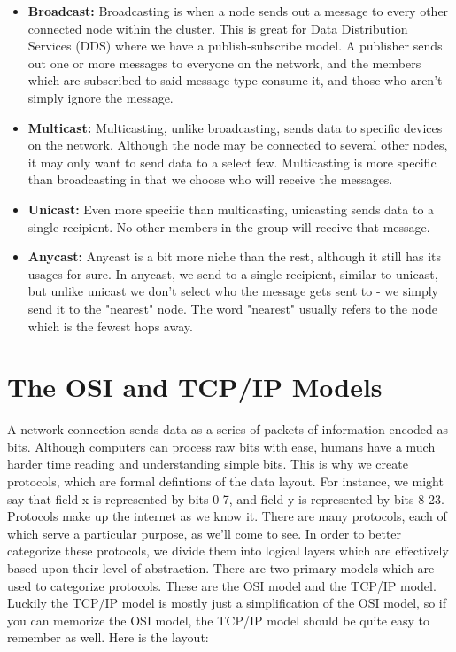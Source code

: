 \documentclass{article}
\begin{document}
\begin{itemize}

\item{%
    \textbf{Broadcast:} Broadcasting is when a node sends out a message to every other connected node within
    the cluster. This is great for Data Distribution Services (DDS) where we have a publish-subscribe model.
    A publisher sends out one or more messages to everyone on the network, and the members which are subscribed
    to said message type consume it, and those who aren't simply ignore the message.
}

\item{%
    \textbf{Multicast:} Multicasting, unlike broadcasting, sends data to specific devices on the network.
    Although the node may be connected to several other nodes, it may only want to send data to a select few.
    Multicasting is more specific than broadcasting in that we choose who will receive the messages.
}

\item{%
    \textbf{Unicast:} Even more specific than multicasting, unicasting sends data to a single recipient. No
    other members in the group will receive that message.
}

\item{%
    \textbf{Anycast:} Anycast is a bit more niche than the rest, although it still has its usages for sure.
    In anycast, we send to a single recipient, similar to unicast, but unlike unicast we don't select who the
    message gets sent to - we simply send it to the "nearest" node. The word "nearest" usually refers to the
    node which is the fewest hops away.
}

\end{itemize}

\section{The OSI and TCP/IP Models}

A network connection sends data as a series of packets of information encoded as bits. Although computers can
process raw bits with ease, humans have a much harder time reading and understanding simple bits. This is why
we create protocols, which are formal defintions of the data layout. For instance, we might say that field x
is represented by bits 0-7, and field y is represented by bits 8-23. Protocols make up the internet as we know
it. There are many protocols, each of which serve a particular purpose, as we'll come to see. In order to
better categorize these protocols, we divide them into logical layers which are effectively based upon their
level of abstraction. There are two primary models which are used to categorize protocols. These are the OSI
model and the TCP/IP model. Luckily the TCP/IP model is mostly just a simplification of the OSI model, so if
you can memorize the OSI model, the TCP/IP model should be quite easy to remember as well. Here is the layout:
\end{document}

